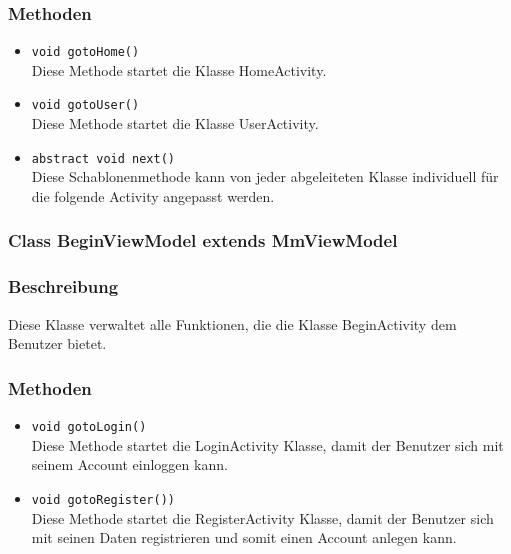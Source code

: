 \documentclass[a4paper]{scrreprt}
\begin{document}
\subsubsection*{Methoden}
\begin{addmargin}[25pt]{0pt}
\begin{itemize}


\item \texttt{void gotoHome()}\\
	Diese Methode startet die Klasse HomeActivity.

\item \texttt{void gotoUser()}\\
	Diese Methode startet die Klasse UserActivity.
	
\item \texttt{abstract void next()}\\
	Diese Schablonenmethode kann von jeder abgeleiteten Klasse individuell für die folgende Activity angepasst werden.
	
\end{itemize}
\end{addmargin}


\subsubsection{Class BeginViewModel extends MmViewModel}
\subsubsection*{Beschreibung}
Diese Klasse verwaltet alle Funktionen, die die Klasse BeginActivity dem Benutzer bietet.

\subsubsection*{Methoden}
\begin{addmargin}[25pt]{0pt}
\begin{itemize}

\item \texttt{void gotoLogin()}\\
	Diese Methode startet die LoginActivity Klasse, damit der Benutzer sich mit seinem Account einloggen kann.

\item \texttt{void gotoRegister())}\\
	Diese Methode startet die RegisterActivity Klasse, damit der Benutzer sich mit seinen Daten registrieren und somit einen Account anlegen kann.

\end{itemize}
\end{addmargin}
\end{document}
